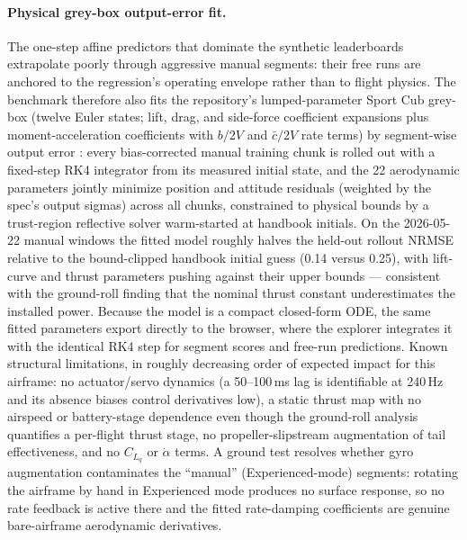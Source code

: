 \documentclass[11pt]{article}
\begin{document}
\paragraph{Physical grey-box output-error fit.}
The one-step affine predictors that dominate the synthetic leaderboards
extrapolate poorly through aggressive manual segments: their free runs are
anchored to the regression's operating envelope rather than to flight
physics. The benchmark therefore also fits the repository's lumped-parameter
Sport Cub grey-box (twelve Euler states; lift, drag, and side-force
coefficient expansions plus moment-acceleration coefficients with
$b/2V$ and $\bar c/2V$ rate terms) by segment-wise output error
\cite{jategaonkar2006flight}: every
bias-corrected manual training chunk is rolled out with a fixed-step RK4
integrator from its measured initial state, and the 22 aerodynamic
parameters jointly minimize position and attitude residuals (weighted by the
spec's output sigmas) across all chunks, constrained to physical bounds by a
trust-region reflective solver warm-started at handbook initials. On the
2026-05-22 manual windows the fitted model roughly halves the held-out
rollout NRMSE relative to the bound-clipped handbook initial guess
(0.14 versus 0.25), with lift-curve and thrust parameters pushing against
their upper bounds --- consistent with the ground-roll finding that the
nominal thrust constant underestimates the installed power. Because the
model is a compact closed-form ODE, the same fitted parameters export
directly to the browser, where the explorer integrates it with the identical
RK4 step for segment scores and free-run predictions. Known structural
limitations, in roughly decreasing order of expected impact for this
airframe: no actuator/servo dynamics (a 50--100\,ms lag is identifiable at
240\,Hz and its absence biases control derivatives low), a static thrust map
with no airspeed or battery-stage dependence even though the ground-roll
analysis quantifies a per-flight thrust stage, no propeller-slipstream
augmentation of tail effectiveness, and no $C_{L_q}$ or
$\dot\alpha$ terms. A ground test resolves whether gyro
augmentation contaminates the ``manual'' (Experienced-mode) segments:
rotating the airframe by hand in Experienced mode produces no surface
response, so no rate feedback is active there and the fitted rate-damping
coefficients are genuine bare-airframe aerodynamic derivatives.
\end{document}
